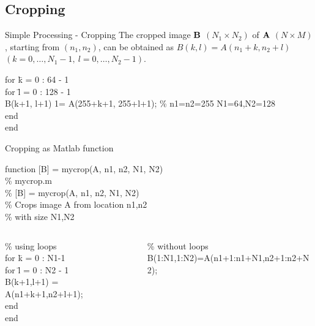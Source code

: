 \subsection{Cropping}
%
%
\begin{slide}{Simple Processing - Cropping}
\scriptsize
The cropped image ${\bf B}$ $(N_1\times N_2)$ of ${\bf A}$ $(N\times
M)$,
starting from $(n_1,n_2)$, can be obtained
as $B(k,l)=A(n_1+k,n_2+l)$ $(k=0,\ldots,N_1-1,\ l=0,\ldots,N_2-1)$.


\begin{code}[8]{}
\begin{tabbing}
for \= k = 0 : 64 - 1 \\
\>  for \= l = 0 : 128 - 1 \\
\>	\>	B(k+1, l+1) 1= A(255+k+1, 255+l+1); \% n1=n2=255 N1=64,N2=128 \\
\>	end \\
end
\end{tabbing}
\end{code}

\end{slide}


%
%
\begin{slide}{Cropping as Matlab function}
\begin{code}[8]{}
function [B] = mycrop(A, n1, n2, N1, N2) \\
\% mycrop.m \\
\% [B] = mycrop(A, n1, n2, N1, N2) \\
\% Crops image A from location n1,n2 \\
\% with size N1,N2 
\begin{columns}
\begin{column}{0.5\textwidth}
\begin{tabbing}
\% using loops\\
for \= k = 0 : N1-1 \\
\>    for \= l = 0 : N2 - 1 \\
\>	 \>    B(k+1,l+1) = A(n1+k+1,n2+l+1); \\
\>    end \\
end \\  
\end{tabbing}
\end{column}
\begin{column}{0.5\textwidth}
\% without loops\\
B(1:N1,1:N2)=A(n1+1:n1+N1,n2+1:n2+N2); 
\end{column}
\end{columns}

\end{code}
\end{slide}

